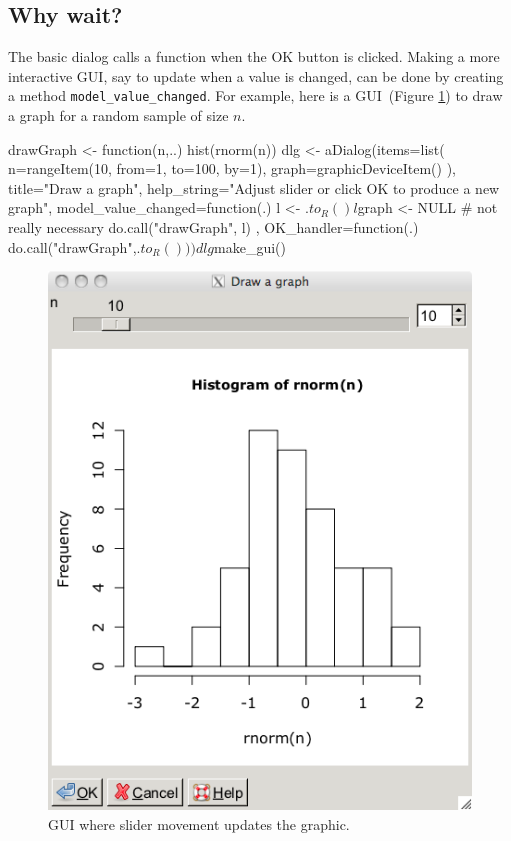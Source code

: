 \documentclass{article}
\newcommand{\code}[1]{\texttt{#1}} %
\newcommand{\generic}[1]{\code{#1}} %
\newcommand{\meth}[1]{\generic{#1}}     %
\begin{document}
\subsection{Why wait?}
\label{sec:why-wait}

The basic dialog calls a function when the OK button is clicked. 
Making a more interactive GUI, say to update when a value is changed,
can be done by creating a method \meth{model\_value\_changed}. For
example, here is a GUI~(Figure \ref{fig:why-wait}) to draw a graph for a random sample of size $n$.
\begin{Schunk}
\begin{Sinput}
 drawGraph <- function(n,..) hist(rnorm(n))
 dlg <- aDialog(items=list(
                  n=rangeItem(10, from=1, to=100, by=1),
                  graph=graphicDeviceItem()
                  ),
                title="Draw a graph",
                help_string="Adjust slider or click OK to produce a new graph",
                model_value_changed=function(.) {
                  l <- .$to_R()
                  l$graph <- NULL        # not really necessary
                  do.call("drawGraph", l)
                },
                OK_handler=function(.) do.call("drawGraph",.$to_R())
                )
 dlg$make_gui()
\end{Sinput}
\end{Schunk}


\begin{figure}
  \centering
  \includegraphics[width=.6\textwidth]{why-wait}
  \caption{GUI where slider movement updates the graphic.}
  \label{fig:why-wait}
\end{figure}
\end{document}
